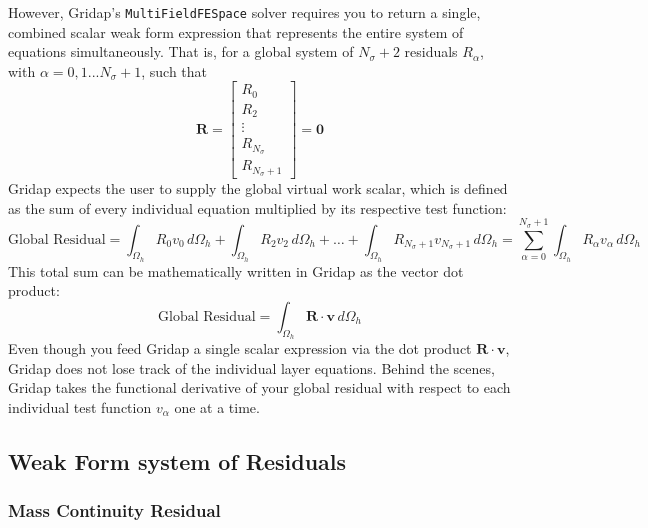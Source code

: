 \documentclass{article}
\newcommand{\Ns}{N_\sigma}
\newcommand{\Oh}{\Omega_h}
\begin{document}
However, Gridap's \texttt{MultiFieldFESpace} solver requires you to return a single, combined scalar weak form expression that represents the entire system of equations simultaneously.
That is, for a global system of $\Ns+2$ residuals $R_\alpha$, with $\alpha=0,1... \Ns+1$, such that
$$\mathbf{R} = \begin{bmatrix} 
R_0 \\ 
R_2 \\ 
\vdots \\ 
R_{\Ns} \\
R_{\Ns+1}
\end{bmatrix} = \mathbf{0}$$
Gridap expects the user to supply the global virtual work scalar, which is defined as the sum of every individual equation multiplied by its respective test function:
$$\text{Global Residual} = \int_{\Oh} R_0 v_0 \, d\Oh + \int_{\Oh} R_2 v_2 \, d\Oh + \dots + \int_{\Oh} R_{\Ns+1} v_{\Ns+1} \, d\Oh = \sum_{\alpha = 0}^{\Ns+1} \int_{\Oh} R_\alpha v_\alpha \, d\Oh$$
This total sum can be mathematically written in Gridap as the vector dot product:
\begin{equation}
    \text{Global Residual} = \int_{\Oh} \mathbf{R} \cdot \mathbf{v} \, d\Oh
    \label{eq: Gridap multifield FE space global residual}
\end{equation}
Even though you feed Gridap a single scalar expression via the dot product $\mathbf{R} \cdot \mathbf{v}$, Gridap does not lose track of the individual layer equations.
Behind the scenes, Gridap takes the functional derivative of your global residual with respect to each individual test function $v_\alpha$ one at a time.


\subsection*{Weak Form system of Residuals}

\subsubsection*{Mass Continuity Residual}
\end{document}
